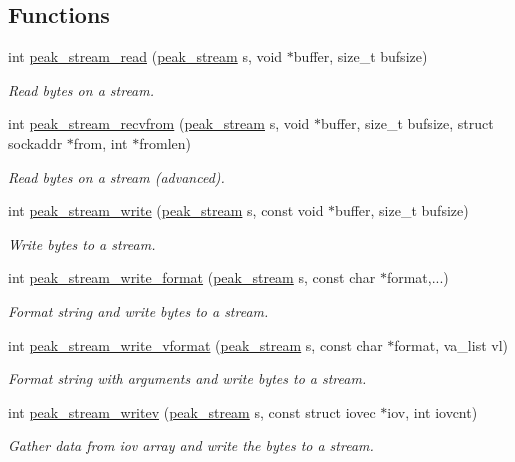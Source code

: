 \subsection*{Functions}
\begin{CompactItemize}
\item 
int \hyperlink{group__stream__low_ga0}{peak\_\-stream\_\-read} (\hyperlink{group__stream_ga0}{peak\_\-stream} s, void $\ast$buffer, size\_\-t bufsize)
\begin{CompactList}\small\item\em Read bytes on a stream. \item\end{CompactList}\item 
int \hyperlink{group__stream__low_ga1}{peak\_\-stream\_\-recvfrom} (\hyperlink{group__stream_ga0}{peak\_\-stream} s, void $\ast$buffer, size\_\-t bufsize, struct sockaddr $\ast$from, int $\ast$fromlen)
\begin{CompactList}\small\item\em Read bytes on a stream (advanced). \item\end{CompactList}\item 
int \hyperlink{group__stream__low_ga2}{peak\_\-stream\_\-write} (\hyperlink{group__stream_ga0}{peak\_\-stream} s, const void $\ast$buffer, size\_\-t bufsize)
\begin{CompactList}\small\item\em Write bytes to a stream. \item\end{CompactList}\item 
int \hyperlink{group__stream__low_ga3}{peak\_\-stream\_\-write\_\-format} (\hyperlink{group__stream_ga0}{peak\_\-stream} s, const char $\ast$format,...)
\begin{CompactList}\small\item\em Format string and write bytes to a stream. \item\end{CompactList}\item 
int \hyperlink{group__stream__low_ga4}{peak\_\-stream\_\-write\_\-vformat} (\hyperlink{group__stream_ga0}{peak\_\-stream} s, const char $\ast$format, va\_\-list vl)
\begin{CompactList}\small\item\em Format string with arguments and write bytes to a stream. \item\end{CompactList}\item 
int \hyperlink{group__stream__low_ga5}{peak\_\-stream\_\-writev} (\hyperlink{group__stream_ga0}{peak\_\-stream} s, const struct iovec $\ast$iov, int iovcnt)
\begin{CompactList}\small\item\em Gather data from iov array and write the bytes to a stream. \item\end{CompactList}\end{CompactItemize}


